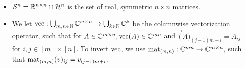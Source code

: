 \begin{itemize}
  \item $\mathcal{S}^n = \R^{n \times n} \cap \H^n$ is the set of real, symmetric $n \times n$ matrices.
    \item We let $\vec : \bigcup_{m, n \in \N} \C^{m \times n} \to \bigcup_{k \in \N} \C^k$ be the columnwise vectorization operator, such that for $A \in \C^{m \times n}, \vec(A) \in \C^{m n}$ and  $\vec(A)_{(j - 1) m + i} = A_{i j}$ for $i, j \in [m] \times [n]$.  To invert $\vec$, we use $\mat_{(m, n)} : \C^{m n} \to \C^{m \times n},$ such that $\mat_{(m, n)}(v)_{ij} = v_{(j - 1) m + i}$.
    
    
\end{itemize}
